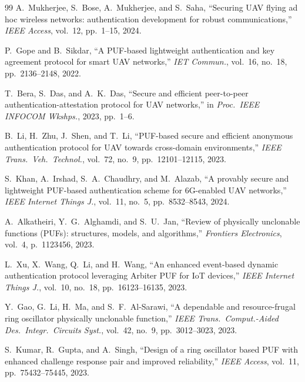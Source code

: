 \documentclass[journal,a4paper,10pt]{IEEEtran}
\begin{document}
\balance
\begin{thebibliography}{99}
 A.~Mukherjee, S.~Bose, A.~Mukherjee, and
S.~Saha, ``Securing UAV flying ad hoc wireless networks:
authentication development for robust communications,'' \emph{IEEE
Access}, vol.~12, pp.~1--15, 2024.

 P.~Gope and B.~Sikdar, ``A PUF-based
lightweight authentication and key agreement protocol for smart UAV
networks,'' \emph{IET Commun.}, vol.~16, no.~18, pp.~2136--2148, 2022.

 T.~Bera, S.~Das, and A.~K.~Das, ``Secure and
efficient peer-to-peer authentication-attestation protocol for UAV
networks,'' in \emph{Proc.\ IEEE INFOCOM Wkshps.}, 2023, pp.~1--6.

 B.~Li, H.~Zhu, J.~Shen, and T.~Li,
``PUF-based secure and efficient anonymous authentication protocol
for UAV towards cross-domain environments,'' \emph{IEEE Trans.\ Veh.\
Technol.}, vol.~72, no.~9, pp.~12101--12115, 2023.

 S.~Khan, A.~Irshad, S.~A.~Chaudhry, and
M.~Alazab, ``A provably secure and lightweight PUF-based
authentication scheme for 6G-enabled UAV networks,'' \emph{IEEE
Internet Things J.}, vol.~11, no.~5, pp.~8532--8543, 2024.

 A.~Alkatheiri, Y.~G.~Alghamdi, and S.~U.~Jan,
``Review of physically unclonable functions (PUFs): structures,
models, and algorithms,'' \emph{Frontiers Electronics}, vol.~4,
p.~1123456, 2023.

 L.~Xu, X.~Wang, Q.~Li, and H.~Wang,
``An enhanced event-based dynamic authentication protocol leveraging
Arbiter PUF for IoT devices,'' \emph{IEEE Internet Things J.},
vol.~10, no.~18, pp.~16123--16135, 2023.

 Y.~Gao, G.~Li, H.~Ma, and S.~F.~Al-Sarawi,
``A dependable and resource-frugal ring oscillator physically
unclonable function,'' \emph{IEEE Trans.\ Comput.-Aided Des.\ Integr.\
Circuits Syst.}, vol.~42, no.~9, pp.~3012--3023, 2023.

 S.~Kumar, R.~Gupta, and A.~Singh,
``Design of a ring oscillator based PUF with enhanced challenge
response pair and improved reliability,'' \emph{IEEE Access},
vol.~11, pp.~75432--75445, 2023.


\end{thebibliography}
\end{document}
